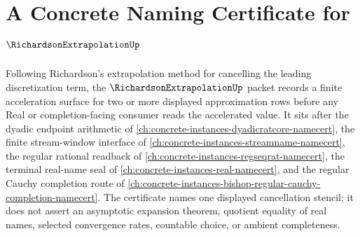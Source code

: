\chapter{A Concrete Naming Certificate for $\RichardsonExtrapolationUp$}
\label{ch:concrete-instances-richardson-extrapolation-namecert}

Following Richardson's extrapolation method for cancelling the leading discretization term, the $\RichardsonExtrapolationUp$ packet records a finite acceleration surface for two or more displayed approximation rows before any Real or completion-facing consumer reads the accelerated value. It sits after the dyadic endpoint arithmetic of \autoref{ch:concrete-instances-dyadicratcore-namecert}, the finite stream-window interface of \autoref{ch:concrete-instances-streamname-namecert}, the regular rational readback of \autoref{ch:concrete-instances-regseqrat-namecert}, the terminal real-name seal of \autoref{ch:concrete-instances-real-namecert}, and the regular Cauchy completion route of \autoref{ch:concrete-instances-bishop-regular-cauchy-completion-namecert}. The certificate names one displayed cancellation stencil; it does not assert an asymptotic expansion theorem, quotient equality of real names, selected convergence rates, countable choice, or ambient completeness.

